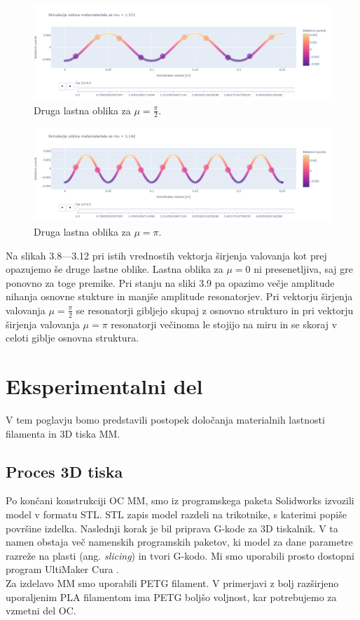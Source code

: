 \documentclass[12pt]{report}
\begin{document}
\begin{figure}[H]
  \centering
  \includegraphics[trim={0 4cm 0 3.5cm},clip, scale=0.3]{Images/Metamaterial_oblika_2_mu_1.571.png}
  \caption{Druga lastna oblika za $\mu = \frac{\pi}{2}$.}
\end{figure}
\begin{figure}[H]
  \centering
  \includegraphics[trim={0 4cm 0 3.5cm},clip, scale=0.3]{Images/Metamaterial_oblika_2_mu_3.142.png}
  \caption{Druga lastna oblika za $\mu = \pi$.}
\end{figure}
\noindent Na slikah 3.8---3.12 pri istih vrednostih vektorja širjenja valovanja kot prej opazujemo še druge lastne oblike. Lastna oblika za $\mu = 0$ ni presenetljiva, saj gre ponovno za toge premike. Pri stanju na sliki 3.9 pa opazimo večje amplitude nihanja osnovne stukture in manjše amplitude resonatorjev.
Pri vektorju širjenja valovanja $\mu = \frac{\pi}{2}$ se resonatorji gibljejo skupaj z osnovno strukturo in pri vektorju širjenja valovanja $\mu = \pi$ resonatorji večinoma le stojijo na miru in se skoraj v celoti giblje osnovna struktura.


\chapter{Eksperimentalni del}
V tem poglavju bomo predstavili postopek določanja materialnih lastnosti filamenta in 3D tiska \ac{MM}.

\section{Proces 3D tiska}
Po končani konstrukciji \ac{OC} \ac{MM}, smo iz programskega paketa Solidworks \cite{solidworks} izvozili model v formatu STL. STL zapis model razdeli na trikotnike, s katerimi popiše površine izdelka. Naslednji korak je bil priprava G-kode za 3D tiskalnik. V ta namen obstaja več namenskih programskih paketov, ki model za dane parametre razreže na plasti (ang. \emph{slicing}) in tvori
G-kodo. Mi smo uporabili prosto dostopni program UltiMaker Cura \cite{cura}. \\
Za izdelavo \ac{MM} smo uporabili PETG filament. V primerjavi z bolj razširjeno uporaljenim PLA filamentom ima PETG boljšo voljnost, kar potrebujemo za vzmetni del \ac{OC}.
\end{document}
